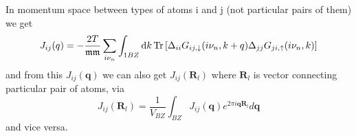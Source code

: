 \documentclass[12pt,a4paper]{article}
\begin{document}
In momentum space between types of atoms i and j (not particular pairs of them) we get 
\begin{equation}
    J_{i j} (q) = -\frac{2T}{{\mathfrak m} {\mathfrak m}}   \sum_{i \nu_n}  \int_{1 BZ} \mathop{}\!\mathrm{d} k \operatorname{Tr}
    \left[\Delta_{ i i} G_{ i j, \downarrow}(i \nu_n, k+ q) \Delta_{j j} G_{j i, \uparrow}(i \nu_n, k) \right]
\end{equation}
and from this $J_{i j} (\mathbf{q})$ we can also get $J_{i j}(\mathbf{R}_{l})$ where $\mathbf{R}_{l}$ is vector connecting particular pair of atoms, via 
\begin{equation}
    J_{i j}(\mathbf{R}_{l}) = \frac{1}{V_{BZ}} \int_{B Z} J_{i j} (\mathbf{q}) e^{2 \pi i \mathbf{q} \mathbf{R}_{l}} d \mathbf{q}
\end{equation}
and vice versa.







\end{document}
